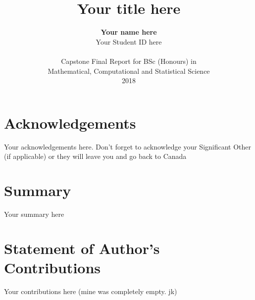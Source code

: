 \documentclass[12pt]{article}
\title{\textbf{Your title here}}
\author{\textbf{Your name here}\\
Your Student ID here\\
\\
Capstone Final Report for BSc (Honours) in\\
Mathematical, Computational and Statistical Science\\
2018}
\date{}
\begin{document}
\begin{spacing}{1.9}



\clearpage



\clearpage

\section*{Acknowledgements}
Your acknowledgements here. Don't forget to acknowledge your Significant Other (if applicable) or they will leave you and go back to Canada

\section*{Summary}
Your summary here

\section*{Statement of Author's Contributions}
Your contributions here (mine was completely empty. jk)

\clearpage

\tableofcontents

\clearpage


\end{spacing}
\end{document}
